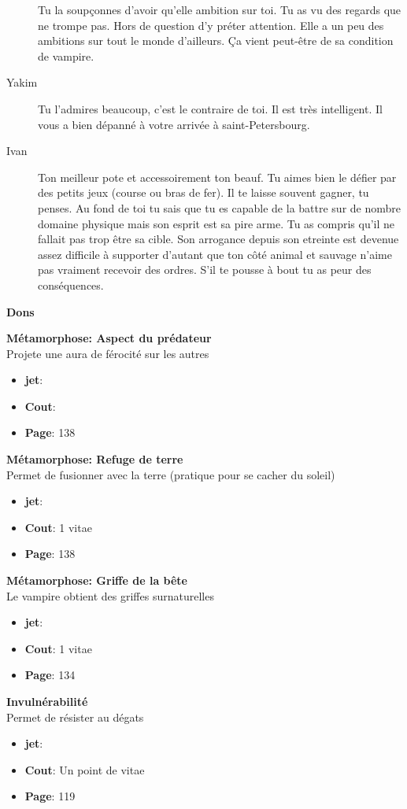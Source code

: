 \documentclass[oneside,12pt]{book}
\newcommand\don[5]{
\textbf{#1} \\
#2
\begin{itemize}
\item{ \textbf{jet}: #3}
\item{ \textbf{Cout}: #4}
\item{ \textbf{Page}: #5}
\end{itemize}
\vspace{0.5cm}
}
\begin{document}
\begin{flushleft}
\begin{description}
{Tu la soupçonnes d'avoir qu'elle ambition sur toi. Tu as vu des regards que ne trompe pas. Hors de question d'y préter attention. Elle a un peu des ambitions sur tout le monde d'ailleurs. Ça vient peut-être de sa condition de vampire. }
\item[Yakim]{Tu l'admires beaucoup, c'est le contraire de toi. Il est très intelligent. Il vous a bien dépanné à votre arrivée à saint-Petersbourg.    }
\item[Ivan]{Ton meilleur pote et accessoirement ton beauf. Tu aimes bien le défier par des petits jeux (course ou bras de fer). Il te laisse souvent gagner, tu penses.
Au fond de toi tu sais que tu es capable de la battre sur de nombre domaine physique mais son esprit est sa pire arme. Tu as compris qu'il ne fallait pas trop être sa cible. Son arrogance depuis son etreinte est devenue assez difficile à supporter d'autant que ton côté animal et sauvage n'aime pas vraiment recevoir des ordres. S'il te pousse à bout tu as peur des conséquences.}
\end{description}
 
\clearpage
\textbf{\large Dons}
\vspace{0.5cm}

\don{Métamorphose: Aspect du prédateur}{Projete une aura de férocité sur les autres}{}{}{138}
\don{Métamorphose: Refuge de terre}{Permet de fusionner avec la terre (pratique pour se cacher du soleil)}{}{1 vitae}{138}
\don{Métamorphose: Griffe de la bête}{Le vampire obtient des griffes surnaturelles}{}{1 vitae}{134 }
\don{Invulnérabilité}{Permet de résister au dégats}{}{Un point de vitae}{119}


\clearpage

\end{flushleft}
\end{document}
